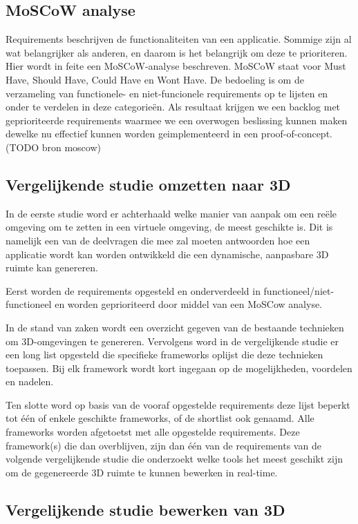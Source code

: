 \subsection{MoSCoW analyse}

Requirements beschrijven de functionaliteiten van een applicatie. Sommige zijn al wat belangrijker als anderen, en daarom is het belangrijk om deze te prioriteren.
Hier wordt in feite een MoSCoW-analyse beschreven. MoSCoW staat voor Must Have, Should Have, Could Have en Wont Have. De bedoeling is om de verzameling van functionele- en niet-funcionele requirements op te lijsten en onder te verdelen in deze categorieën. Als resultaat krijgen we een backlog met geprioriteerde requirements waarmee we een overwogen beslissing kunnen maken dewelke nu effectief kunnen worden geimplementeerd in een proof-of-concept. (TODO bron moscow)

\subsection{Vergelijkende studie omzetten naar 3D }

In de eerste studie word er achterhaald welke manier van aanpak om een reële omgeving om te zetten in een virtuele omgeving, de meest geschikte is. Dit is namelijk een van de deelvragen die mee zal moeten antwoorden hoe een applicatie wordt kan worden ontwikkeld die een dynamische, aanpasbare 3D ruimte kan genereren.

Eerst worden de requirements opgesteld en onderverdeeld in functioneel/niet-functioneel en worden geprioriteerd door middel van een MoSCow analyse.

In de stand van zaken wordt een overzicht gegeven van de bestaande technieken om 3D-omgevingen te genereren. Vervolgens word in de vergelijkende studie er een long list opgesteld die specifieke frameworks oplijst die deze technieken toepassen. Bij elk framework wordt kort ingegaan op de mogelijkheden, voordelen en nadelen.

Ten slotte word op basis van de vooraf opgestelde requirements deze lijst beperkt tot één of enkele geschikte frameworks, of de shortlist ook genaamd. Alle frameworks worden afgetoetst met alle opgestelde requirements. Deze framework(s) die dan overblijven, zijn dan één van de requirements van de volgende vergelijkende studie die onderzoekt welke tools het meest geschikt zijn om de gegenereerde 3D ruimte te kunnen bewerken in real-time.


\subsection{Vergelijkende studie bewerken van 3D }

